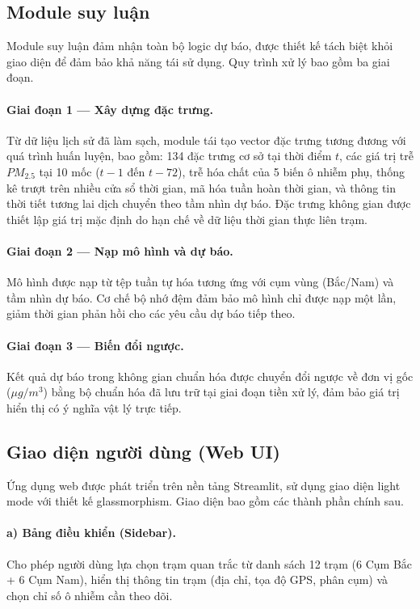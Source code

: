 \subsection{Module suy luận}

Module suy luận đảm nhận toàn bộ logic dự báo, được thiết kế tách biệt khỏi giao diện để đảm bảo khả năng tái sử dụng. Quy trình xử lý bao gồm ba giai đoạn.

\paragraph{Giai đoạn 1 --- Xây dựng đặc trưng.} Từ dữ liệu lịch sử đã làm sạch, module tái tạo vector đặc trưng tương đương với quá trình huấn luyện, bao gồm: 134 đặc trưng cơ sở tại thời điểm $t$, các giá trị trễ $PM_{2.5}$ tại 10 mốc ($t-1$ đến $t-72$), trễ hóa chất của 5 biến ô nhiễm phụ, thống kê trượt trên nhiều cửa sổ thời gian, mã hóa tuần hoàn thời gian, và thông tin thời tiết tương lai dịch chuyển theo tầm nhìn dự báo. Đặc trưng không gian được thiết lập giá trị mặc định do hạn chế về dữ liệu thời gian thực liên trạm.

\paragraph{Giai đoạn 2 --- Nạp mô hình và dự báo.} Mô hình được nạp từ tệp tuần tự hóa tương ứng với cụm vùng (Bắc/Nam) và tầm nhìn dự báo. Cơ chế bộ nhớ đệm đảm bảo mô hình chỉ được nạp một lần, giảm thời gian phản hồi cho các yêu cầu dự báo tiếp theo.

\paragraph{Giai đoạn 3 --- Biến đổi ngược.} Kết quả dự báo trong không gian chuẩn hóa được chuyển đổi ngược về đơn vị gốc ($\mu g/m^3$) bằng bộ chuẩn hóa đã lưu trữ tại giai đoạn tiền xử lý, đảm bảo giá trị hiển thị có ý nghĩa vật lý trực tiếp.

\subsection{Giao diện người dùng (Web UI)}

Ứng dụng web được phát triển trên nền tảng Streamlit, sử dụng giao diện light mode với thiết kế glassmorphism. Giao diện bao gồm các thành phần chính sau.

\paragraph{a) Bảng điều khiển (Sidebar).} Cho phép người dùng lựa chọn trạm quan trắc từ danh sách 12 trạm (6 Cụm Bắc + 6 Cụm Nam), hiển thị thông tin trạm (địa chỉ, tọa độ GPS, phân cụm) và chọn chỉ số ô nhiễm cần theo dõi.

